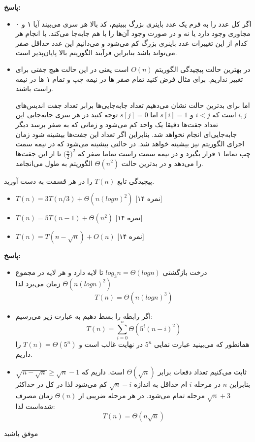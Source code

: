 \documentclass[12pt, a4paper]{article}
\newcommand{\vsp}{\vspace{34pt}}
\newcommand{\پاسخ}[2]{\color{answercolor}\textbf{پاسخ: }#2\color{black}\vspace{-0.3cm}}
\begin{document}
\پاسخ{\vsp\vsp}{
	\begin{itemize}
		\item 
		اگر کل عدد را به فرم یک عدد باینری بزرگ ببینیم، کد بالا هر سری می‌بیند آیا ۱ و ۰ مجاوری وجود دارد یا نه و در صورت وجود آن‌ها را با هم جابه‌جا می‌کند. با انجام هر کدام از این تغییرات عدد باینری بزرگ کم می‌شود و می‌دانیم این عدد حداقل صفر می‌تواند باشد بنابراین فرآیند الگوریتم بالا پایان‌پذیر است.
		
		\item
		در بهترین حالت پیچیدگی الگوریتم
		$O(n)$
		است یعنی در این حالت هیچ جفتی برای تغییر نداریم. برای مثال فرض کنید تمام صفر ها در نیمه چپ و تمام ۱ ها در نیمه راست باشند.
		
		اما برای بدترین حالت نشان می‌دهیم تعداد جابه‌جایی‌ها برابر تعداد جفت‌ اندیس‌های 
		$i,j$
		است که 
		$i < j$
		و 
		$s[i] = 1$
		اما
		$s[j] = 0$
		توجه کنید در هر سری جابه‌جایی این تعداد جفت‌ها دقیقا یک واحد کم می‌شود و زمانی که به صفر برسد دیگر جابه‌جایی‌ای انجام نخواهد شد. بنابراین اگر تعداد این جفت‌ها بیشینه شود زمان اجرای الگوریتم نیز بیشینه خواهد شد. در حالتی بیشینه می‌شود که در نیمه سمت چپ تماما ۱ قرار بگیرد و در نیمه سمت راست تماما صفر که
		$\big(\frac{n}{2}\big)^2$
		تا از این جفت‌ها را می‌دهد و در بدترین حالت
		$\Theta(n^2)$
		الگوریتم به طول می‌انجامد.
	\end{itemize}
	
}

پیچیدگی تابع $T(n)$ را در هر قسمت به دست آورید.
\begin{itemize}
	\item $T(n) = 3T(n/3) + \Theta(n(logn)^2)$ [۱۴ نمره]
	\item $T(n) = 5T(n-1) + \Theta(n^2)$ [۱۴ نمره]
	\item $T(n) = T(n - \sqrt{n}) + O(n)$ [۱۴ نمره]
\end{itemize}

\پاسخ{\vsp\vsp}{
	
	\begin{itemize}
		\item 
		درخت بازگشتی 
		$log_3 n = \Theta(logn)$
		تا لایه دارد و هر لایه در مجموع
		$\Theta(n(logn)^2)$
		زمان می‌برد لذا 
		$$T(n) = \Theta(n(logn)^3)$$
		
		\item 
		اگر رابطه را بسط دهیم به عبارت زیر می‌رسیم:
		$$T(n) = \sum_{i=0}^n \Theta(5^i (n-i)^2)$$
		همانطور که می‌بینید عبارت نمایی
		$5^n$
		در نهایت غالب است و 
		$T(n) = \Theta(5^n)$
		را داریم.
		
		\item
		ثابت می‌کنیم تعداد دفعات
		\lr{recursion}
		برابر 
		$\Theta(\sqrt{n})$
		است. داریم که
		$\sqrt{n - \sqrt{n}} \ge \sqrt{n} - 1$
		بنابراین $n$ در مرحله $i$ ام حداقل به اندازه
		$\sqrt{n} - i$
		کم می‌شود لذا در کل در حداکثر
		$\sqrt{n} + 3$
		مرحله 
		\lr{recursion}
		تمام می‌شود. در هر مرحله 
		\lr{recursion}
		ضریبی از 
		$\Theta(n)$
		زمان مصرف شده‌است لذا:
		$$T(n) = \Theta(n \sqrt{n})$$
	\end{itemize}
	
}


\vspace{1pt}
\begin{flushleft}
موفق باشید
\end{flushleft}
\end{document}
